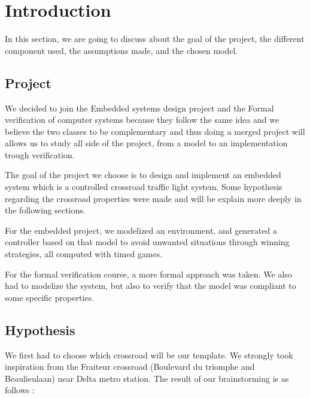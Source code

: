 \section{Introduction}
In this section, we are going to discuss about the goal of the project, the different component used, the assumptions made, and the chosen model.

\subsection{Project}

We decided to join the Embedded systems design project and the Formal verification of computer systems because they follow the same idea and we believe the two classes to be complementary and thus doing a merged project will allows us to study all side of the project, from a model to an implementation trough verification.

The goal of the project we choose is to design and implement an embedded system which is a controlled crossroad traffic light system. Some hypothesis regarding the crossroad properties were made and will be explain more deeply in the following sections.

For the embedded project, we modelized an environment, and generated a controller based on that model to avoid unwanted situations through winning strategies, all computed with timed games. 

For the formal verification course, a more formal approach was taken. We also had to modelize the system, but also to verify that the model was compliant to some specific properties. 

\subsection{Hypothesis}

We first had to choose which crossroad will be our template. We strongly took inspiration from the Fraiteur crossroad (Boulevard du triomphe and Beaulieulaan) near Delta metro station. The result of our brainstorming is as follows :

